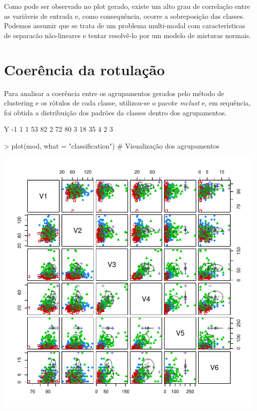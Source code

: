 \documentclass{article}
\begin{document}
Como pode ser observado no plot gerado, existe um alto grau de correlação entre as variáveis de entrada e, como consequência, ocorre a sobreposição das classes. Podemos assumir que se trata de um problema multi-modal com características de separacão não-lineares e tentar resolvê-lo por um modelo de misturas normais.

\section{Coerência da rotulação}
Para analisar a coerência entre os agrupamentos gerados pelo método de clustering e os rótulos de cada classe, utilizou-se o pacote \textit{mclust} e, em sequência, foi obtida a distribuição dos padrões da classes dentro dos agrupamentos.
\begin{Schunk}
\begin{Soutput}
   Y
    -1  1
  1 53 82
  2 72 80
  3 18 35
  4  2  3
\end{Soutput}
\begin{Sinput}
> plot(mod, what = "classification") # Visualização dos agrupamentos
\end{Sinput}
\end{Schunk}
\includegraphics{prova-003}
\end{document}
